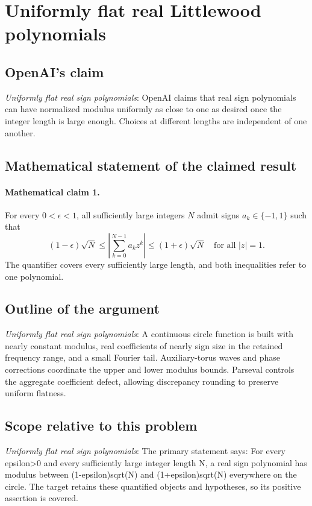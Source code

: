 \documentclass[11pt]{article}
\begin{document}
\section*{Uniformly flat real Littlewood polynomials}

\subsection{OpenAI's claim}
\textit{Uniformly flat real sign polynomials}: OpenAI claims that real sign polynomials can have normalized modulus uniformly as close to one as desired once the integer length is large enough. Choices at different lengths are independent of one another.

\subsection{Mathematical statement of the claimed result}
\paragraph{Mathematical claim 1.} For every $0<\epsilon<1$, all sufficiently large integers $N$ admit signs $a_k\in\{-1,1\}$ such that \[(1-\epsilon)\sqrt N\le\left|\sum_{k=0}^{N-1}a_kz^k\right|\le(1+\epsilon)\sqrt N\quad\text{for all }|z|=1.\] The quantifier covers every sufficiently large length, and both inequalities refer to one polynomial.

\subsection{Outline of the argument}
\textit{Uniformly flat real sign polynomials}: A continuous circle function is built with nearly constant modulus, real coefficients of nearly sign size in the retained frequency range, and a small Fourier tail. Auxiliary-torus waves and phase corrections coordinate the upper and lower modulus bounds. Parseval controls the aggregate coefficient defect, allowing discrepancy rounding to preserve uniform flatness.

\subsection{Scope relative to this problem}
\textit{Uniformly flat real sign polynomials}: The primary statement says: For every epsilon>0 and every sufficiently large integer length N, a real sign polynomial has modulus between (1-epsilon)sqrt(N) and (1+epsilon)sqrt(N) everywhere on the circle. The target retains these quantified objects and hypotheses, so its positive assertion is covered.
\end{document}
